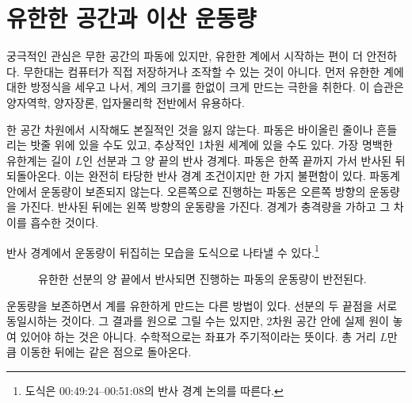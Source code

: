 \begin{classroomqa}\end{classroomqa}

\section{유한한 공간과 이산 운동량}

궁극적인 관심은 무한 공간의 파동에 있지만, 유한한 계에서 시작하는 편이 더 안전하다. 무한대는 컴퓨터가 직접 저장하거나 조작할 수 있는 것이 아니다. 먼저 유한한 계에 대한 방정식을 세우고 나서, 계의 크기를 한없이 크게 만드는 극한을 취한다. 이 습관은 양자역학, 양자장론, 입자물리학 전반에서 유용하다.

한 공간 차원에서 시작해도 본질적인 것을 잃지 않는다. 파동은 바이올린 줄이나 흔들리는 밧줄 위에 있을 수도 있고, 추상적인 1차원 세계에 있을 수도 있다. 가장 명백한 유한계는 길이 \(L\)인 선분과 그 양 끝의 반사 경계다. 파동은 한쪽 끝까지 가서 반사된 뒤 되돌아온다. 이는 완전히 타당한 반사 경계 조건이지만 한 가지 불편함이 있다. 파동계 안에서 운동량이 보존되지 않는다. 오른쪽으로 진행하는 파동은 오른쪽 방향의 운동량을 가진다. 반사된 뒤에는 왼쪽 방향의 운동량을 가진다. 경계가 충격량을 가하고 그 차이를 흡수한 것이다.

반사 경계에서 운동량이 뒤집히는 모습을 도식으로 나타낼 수 있다.\footnote{도식은 00:49:24--00:51:08의 반사 경계 논의를 따른다.}

\begin{figure}[t]\centering
{}\caption{유한한 선분의 양 끝에서 반사되면 진행하는 파동의 운동량이 반전된다.}\end{figure}

운동량을 보존하면서 계를 유한하게 만드는 다른 방법이 있다. 선분의 두 끝점을 서로 동일시하는 것이다. 그 결과를 원으로 그릴 수는 있지만, 2차원 공간 안에 실제 원이 놓여 있어야 하는 것은 아니다. 수학적으로는 좌표가 주기적이라는 뜻이다. 총 거리 \(L\)만큼 이동한 뒤에는 같은 점으로 돌아온다.

